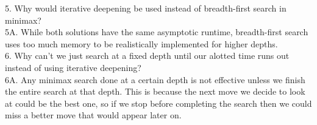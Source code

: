 \documentclass[12pt, letterpaper]{article}
\begin{document}
5. Why would iterative deepening be used instead of breadth-first search in minimax? \\
5A. While both solutions have the same asymptotic runtime, breadth-first search uses too much memory to be realistically implemented for higher depths. \\

6. Why can't we just search at a fixed depth until our alotted time runs out instead of using iterative deepening? \\
6A. Any minimax search done at a certain depth is not effective unless we finish the entire search at that depth. This is because the next move we decide to look at could be the best one, so if we stop before completing the search then we could miss a better move that would appear later on. \\
\end{document}
